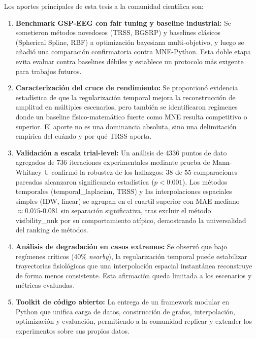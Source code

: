 Los aportes principales de esta tesis a la comunidad científica son:

\begin{enumerate}
    \item \textbf{Benchmark GSP-EEG con fair tuning y baseline industrial:} Se sometieron métodos novedosos (TRSS, BGSRP) y baselines clásicos (Spherical Spline, RBF) a optimización bayesiana multi-objetivo, y luego se añadió una comparación confirmatoria contra MNE-Python. Esta doble etapa evita evaluar contra baselines débiles y establece un protocolo más exigente para trabajos futuros.

    \item \textbf{Caracterización del cruce de rendimiento:} Se proporcionó evidencia estadística de que la regularización temporal mejora la reconstrucción de amplitud en múltiples escenarios, pero también se identificaron regímenes donde un baseline físico-matemático fuerte como MNE resulta competitivo o superior. El aporte no es una dominancia absoluta, sino una delimitación empírica del cuándo y por qué TRSS aporta.
    
    \item \textbf{Validación a escala trial-level:} Un análisis de 4336 puntos de dato agregados de 736 iteraciones experimentales mediante prueba de Mann-Whitney U confirmó la robustez de los hallazgos: 38 de 55 comparaciones pareadas alcanzaron significancia estadística ($p < 0.001$). Los métodos temporales (temporal\_laplacian, TRSS) y las interpolaciones espaciales simples (IDW, linear) se agrupan en el cuartil superior con MAE mediano $\approx 0.075$-0.081 sin separación significativa, tras excluir el método visibility\_nnk por su comportamiento atípico, demostrando la universalidad del ranking de métodos.

    \item \textbf{Análisis de degradación en casos extremos:} Se observó que bajo regímenes críticos (40\% \textit{nearby}), la regularización temporal puede estabilizar trayectorias fisiológicas que una interpolación espacial instantánea reconstruye de forma menos consistente. Esta afirmación queda limitada a los escenarios y métricas evaluadas.

    \item \textbf{Toolkit de código abierto:} La entrega de un framework modular en Python que unifica carga de datos, construcción de grafos, interpolación, optimización y evaluación, permitiendo a la comunidad replicar y extender los experimentos sobre sus propios datos.
\end{enumerate}

